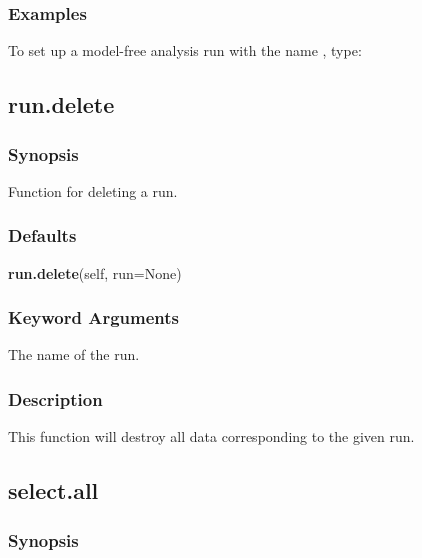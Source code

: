 \subsubsection{Examples}

To set up a model-free analysis run with the name , type:





\newpage

\subsection{run.delete}


\subsubsection{Synopsis}

Function for deleting a run.



\subsubsection{Defaults}

\textsf{\textbf{run.delete}(self, run=None)}


\subsubsection{Keyword Arguments}

  The name of the run. 




\subsubsection{Description}

This function will destroy all data corresponding to the given run.




\newpage

\subsection{select.all}


\subsubsection{Synopsis}

